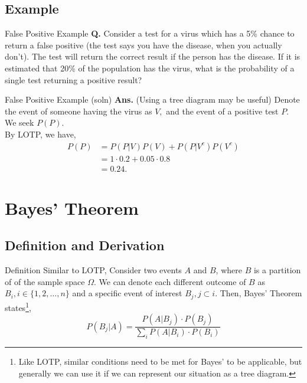 \documentclass{beamer}
\begin{document}
\subsection{Example}

\begin{frame}{False Positive Example}
    \textbf{Q.} Consider a test for a virus which has a 5\% chance to return a false positive (the test says you have the disease, when you actually don't). The test will return the correct result if the person has the disease. If it is estimated that 20\% of the population has the virus, what is the probability of a single test returning a positive result?
\end{frame}

\begin{frame}{False Positive Example (soln)}
    \textbf{Ans.} (Using a tree diagram may be useful) Denote the event of someone having the virus as $V,$ and the event of a positive test $P.$ We seek $P(P).$ \\
    By LOTP, we have,
    \begin{align*}
        P(P) &= P(P | V) P(V) + P(P | V^c) P(V^c) \\
        &= 1 \cdot 0.2 + 0.05 \cdot 0.8 \\
        & = 0.24.
    \end{align*}
\end{frame}

\section{Bayes' Theorem}
\subsection{Definition and Derivation}

\begin{frame}{Definition}
    Similar to LOTP, Consider two events $A$ and $B$, where $B$ is a partition of of the sample space $\Omega.$ We can denote each different outcome of $B$ as $B_i, i \in \{1,2,\dots,n \}$ and a specific event of interest $B_j, j \subset i.$ 
    \newline \newline
    Then, Bayes' Theorem states\footnote{Like LOTP, similar conditions need to be met for Bayes' to be applicable, but generally we can use it if we can represent our situation as a tree diagram.},
    $$
    P(B_j|A) = \frac{P(A | B_j) \cdot P(B_j)}{\sum_{i} P(A | B_i) \cdot P(B_i)}
    $$
\end{frame}
\end{document}
